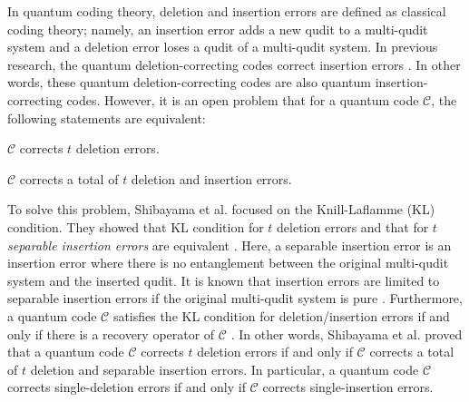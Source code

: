 \documentclass[reprint,amsmath,amssymb,aps,]{revtex4-2}
\theoremstyle{definition}
\newcommand{\1}{\mbox{1}\hspace{-0.25em}\mbox{l}}%
\newcommand{\QU}[1]{\mathcal{#1}}
\begin{document}
In quantum coding theory,
deletion and insertion errors are defined as
classical coding theory;
namely,
an insertion error adds a new qudit to a multi-qudit system
and
a deletion error loses a qudit of a multi-qudit system.
In previous research,
the quantum deletion-correcting codes
\cite{hagiwara2020four,matsumoto2022constructions,hagiwara2023quantum}
correct insertion errors
\cite{hagiwara2021four,nakamura2025multiple,sasaki2024insertion}.
In other words,
these quantum deletion-correcting codes
are also
quantum insertion-correcting codes.
However,
it is an open problem \cite{matsumoto2021survey,hagiwara2024introduction}
that
for a quantum code $\QU{C}$,
the following statements are equivalent:
\begin{enumerate*}[label={(\roman*)}]
\item
  $\QU{C}$
  corrects
  $t$ deletion errors.
\item
  $\QU{C}$
  corrects
  a total of $t$ deletion and insertion errors.
\end{enumerate*}

To solve this problem,
Shibayama et al. 
focused on the Knill-Laflamme (KL) condition.
They 
showed that
KL condition for $t$ deletion errors and
that for $t$ {\it separable insertion errors}
are 
equivalent \cite{shibayama2022equivalence}.
Here,
a separable insertion error is
an insertion error where
there is no entanglement
between the original multi-qudit system and the inserted qudit.
It is known that
insertion errors
are limited to
separable insertion errors
if
the original multi-qudit system is pure \cite{sibayama_single_ins_def}.
Furthermore,
a quantum code $\QU{C}$ satisfies
the KL condition for deletion/insertion errors
if and only if
there is
a recovery operator of $\QU{C}$ \cite{shibayama2025necessary}.
In other words,
Shibayama et al. \cite{shibayama2022equivalence,shibayama2025necessary} proved that
a quantum code $\QU{C}$ corrects
$t$ deletion errors
if and only if
$\QU{C}$ corrects a total of $t$ deletion and separable insertion errors.
In particular, 
a quantum code $\QU{C}$ corrects
single-deletion errors
if and only if
$\QU{C}$ corrects single-insertion errors.
\end{document}
